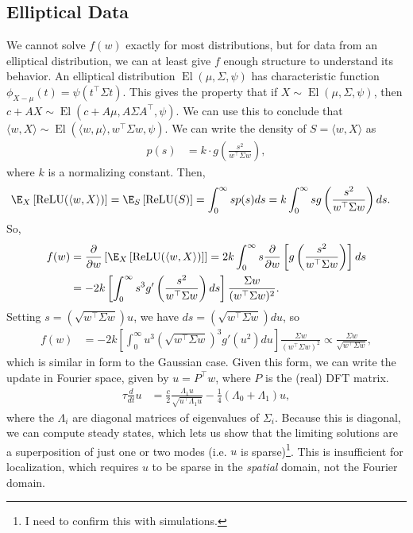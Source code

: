 \documentclass{article}
\begin{document}
\subsection{Elliptical Data}
We cannot solve $f(w)$ exactly for most distributions, but for data from an elliptical distribution, we can at least give $f$ enough structure to understand its behavior.
An elliptical distribution $\operatorname{El}(\mu, \Sigma, \psi)$ has characteristic function $\phi_{X-\mu}(t) = \psi(t^\top \Sigma t)$.
This gives the property that if $X \sim \operatorname{El}(\mu, \Sigma, \psi)$, then $c + A X \sim \operatorname{El}(c + A \mu, A \Sigma A^\top, \psi)$.
We can use this to conclude that $\langle w, X \rangle \sim \operatorname{El}(\langle w, \mu \rangle, w^\top \Sigma w, \psi)$.
We can write the density of $S = \langle w, X \rangle$ as
\begin{align*}
  p(s) &= k \cdot g\left( \frac{s^2}{w^\top \Sigma w} \right),
\end{align*}
where $k$ is a normalizing constant.
Then,
\begin{align*}
  \E_X\left[ \operatorname{ReLU}(\langle w, X \rangle) \right]
  &= \E_S\left[ \operatorname{ReLU}(S) \right]
  = \int_0^{\infty} s p(s) ds
  = k \int_{0}^{\infty} s g\left( \frac{s^2}{w^\top \Sigma w} \right) ds.
\end{align*}
So,
\begin{align*}
  f(w)
  &= \frac{\partial}{\partial w} \left[ \E_X\left[ \operatorname{ReLU}(\langle w, X \rangle) \right] \right]
  = 2 k \int_{0}^{\infty} s \frac{\partial}{\partial w} \left[ g\left( \frac{s^2}{w^\top \Sigma w} \right) \right] ds \\
  &= -2 k \left[ \int_{0}^{\infty} s^3 g'\left( \frac{s^2}{w^\top \Sigma w} \right) ds \right] \frac{\Sigma w}{(w^\top \Sigma w)^2}.
\end{align*}
Setting $s = (\sqrt{w^\top \Sigma w}) u$, we have $ds = (\sqrt{w^\top \Sigma w}) du$, so
\begin{align*}
  f(w)
  &= -2 k \left[ \int_{0}^{\infty} u^3 (\sqrt{w^\top \Sigma w})^3 g'\left( u^2 \right) du \right] \frac{\Sigma w}{(w^\top \Sigma w)^2}
  \propto \frac{ \Sigma w }{ \sqrt{w^\top \Sigma w} },
\end{align*}
which is similar in form to the Gaussian case.
Given this form, we can write the update in Fourier space, given by $u = P^\top w$, where $P$ is the (real) DFT matrix.
\begin{align}
  \tau \frac{d}{dt} u
  &= \frac{c}{2} \frac{ \Lambda_1 u }{ \sqrt{ u^\top \Lambda_1 u } } - \frac{1}{4} ( \Lambda_0 + \Lambda_1 ) u,
\end{align}
where the $\Lambda_i$ are diagonal matrices of eigenvalues of $\Sigma_i$.
Because this is diagonal, we can compute steady states, which lets us show that the limiting solutions are a superposition of just one or two modes (i.e. $u$ is sparse)\footnote{I need to confirm this with simulations.}.
This is insufficient for localization, which requires $u$ to be sparse in the \emph{spatial} domain, not the Fourier domain.
\end{document}
